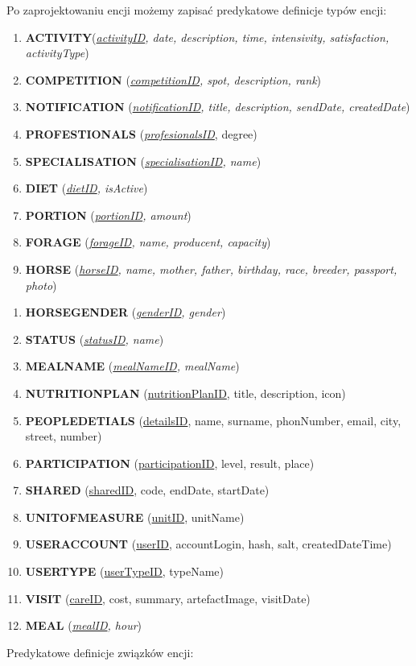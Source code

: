 \documentclass[12pt,twoside]{report}
\begin{document}
\newpage
Po zaprojektowaniu encji możemy zapisać predykatowe definicje typów encji:
\begin{enumerate}[start=1,label={\bfseries ENC$\backslash$0\arabic*}]
	\item \textbf{ACTIVITY}(\textit{\underline{activityID}, date, description, time, intensivity, satisfaction, activityType})
	\item \textbf{COMPETITION} (\textit{\underline{competitionID}, spot, description, rank})
	\item \textbf{NOTIFICATION} (\textit{\underline{notificationID}, title, description, sendDate, createdDate})
	\item \textbf{PROFESTIONALS} (\textit{\underline{profesionalsID}}, degree)
	\item \textbf{SPECIALISATION} (\textit{\underline{specialisationID}, name})
	\item \textbf{DIET} (\textit{\underline{dietID}, isActive})
	\item \textbf{PORTION} (\textit{\underline{portionID}, amount})
	\item \textbf{FORAGE} (\textit{\underline{forageID}, name, producent, capacity})
	\item \textbf{HORSE} (\textit{\underline{horseID}, name, mother, father, birthday, race, breeder, passport, photo})
\end{enumerate}
\begin{enumerate}[start=10,label={\bfseries ENC$\backslash$\arabic*}]
	\item \textbf{HORSEGENDER} (\textit{\underline{genderID}, gender})
	\item \textbf{STATUS} (\textit{\underline{statusID}, name})
	\item \textbf{MEALNAME} (\textit{\underline{mealNameID}, mealName})
	\item \textbf{NUTRITIONPLAN} (\underline{nutritionPlanID}, title, description, icon)
	\item \textbf{PEOPLEDETIALS} (\underline{detailsID}, name, surname, phonNumber, email, city, street, number)
	\item \textbf{PARTICIPATION} (\underline{participationID}, level, result, place)
	\item \textbf{SHARED} (\underline{sharedID}, code, endDate, startDate)
	\item \textbf{UNITOFMEASURE} (\underline{unitID}, unitName)
	\item \textbf{USERACCOUNT} (\underline{userID}, accountLogin, hash, salt, createdDateTime)
	\item \textbf{USERTYPE} (\underline{userTypeID}, typeName)
	\item \textbf{VISIT} (\underline{careID}, cost, summary, artefactImage, visitDate)
    \item \textbf{MEAL} (\textit{\underline{mealID}, hour})
\end{enumerate}
\newpage
	Predykatowe definicje związków encji:
\end{document}
